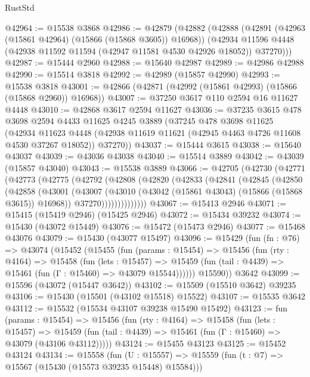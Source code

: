 \begin{lexlean}{RustStd}
\begin{coremodule}
@42964 := @15538 @3868
@42986 := @42879
    (@42882
      (@42888
        (@42891 (@42963 (@15861 @42964) (@15866 (@15868 @3605)) @16968))
        (@42934 @11596 @4448 (@42938 @11592 @11594 (@42947 @11581 @4530 @42926 @18052)) @37270)))
@42987 := @15444 @2960
@42988 := @15640 @42987
@42989 := @42986 @42988
@42990 := @15514 @3818
@42992 := @42989 (@15857 @42990)
@42993 := @15538 @3818
@43001 := @42866 (@42871 (@42992 (@15861 @42993) (@15866 (@15868 @2960)) @16968))
@43007 := @37250 @3617 @110 @2594 @16 @11627 @4448
@43010 := @42868 @3617 @2594 @11627
@43036 := @37235
    @3615
    @478
    @3698
    @2594
    @4433
    @11625
    @4245
    @3889
    (@37245
      @478
      @3698
      @11625
      (@42934
        @11623
        @4448
        (@42938 @11619 @11621 (@42945 @4463 @4726 @11608 @4530 @37267 @18052))
        @37270))
@43037 := @15444 @3615
@43038 := @15640 @43037
@43039 := @43036 @43038
@43040 := @15514 @3889
@43042 := @43039 (@15857 @43040)
@43043 := @15538 @3889
@43066 := @42705
    (@42730
      (@42771
        (@42773
          (@42775
            (@42792
              (@42808
                (@42820
                  (@42833
                    (@42841
                      (@42845
                        (@42850
                          (@42858
                            (@43001
                              (@43007
                                (@43010 (@43042 (@15861 @43043) (@15866 (@15868 @3615)) @16968))
                                @37270))))))))))))))
@43067 := @15413 @2946
@43071 := @15415 (@15419 @2946) (@15425 @2946)
@43072 := @15434 @39232
@43074 := @15430 (@43072 @15449)
@43076 := @15472 (@15473 @2946)
@43077 := @15468 @43076
@43079 := @15430 (@43077 @15497)
@43096 := @15429
    (fun (fn : @76) =>
    @43074
      (@15452
        (@15455
          (fun (params : @15454) =>
          @15456
            (fun (rty : @4164) =>
            @15458
              (fun (lets : @15457) =>
              @15459 (fun (tail : @4439) => @15461 (fun (Γ : @15460) => @43079 @15544))))))
        @15590))
    @3642
@43099 := @15596 (@43072 (@15447 @3642))
@43102 := @15509 (@15510 @3642) @39235
@43106 := @15430 (@15501 (@43102 @15518) @15522)
@43107 := @15535 @3642
@43112 := @15532 (@15534 @43107 @39238 @15490 @15492)
@43123 := fun (params : @15454) =>
  @15456
    (fun (rty : @4164) =>
    @15458
      (fun (lets : @15457) =>
      @15459 (fun (tail : @4439) => @15461 (fun (Γ : @15460) => @43079 (@43106 @43112)))))
@43124 := @15455 @43123
@43125 := @15452 @43124
@43134 := @15558
    (fun (U : @15557) => @15559 (fun (t : @7) => @15567 (@15430 (@15573 @39235 @15448) @15584)))

\end{coremodule}
\end{lexlean}
